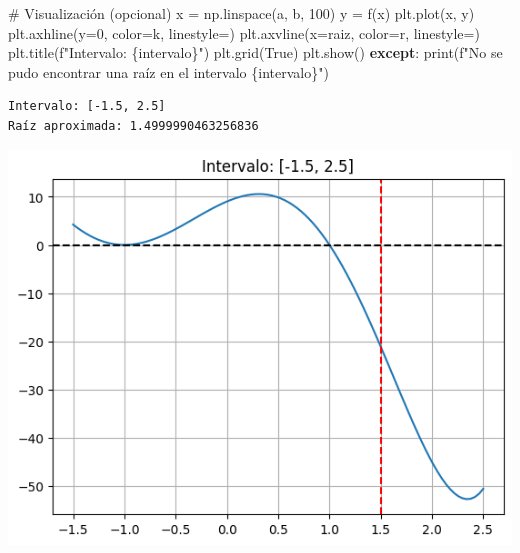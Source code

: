 \documentclass[
  letterpaper,
  DIV=11,
  numbers=noendperiod]{scrartcl}
\newenvironment{Shaded}{\begin{snugshade}}{\end{snugshade}}
\newcommand{\BuiltInTok}[1]{\textcolor[rgb]{0.00,0.23,0.31}{#1}}
\newcommand{\CommentTok}[1]{\textcolor[rgb]{0.37,0.37,0.37}{#1}}
\newcommand{\ControlFlowTok}[1]{\textcolor[rgb]{0.00,0.23,0.31}{\textbf{#1}}}
\newcommand{\DecValTok}[1]{\textcolor[rgb]{0.68,0.00,0.00}{#1}}
\newcommand{\NormalTok}[1]{\textcolor[rgb]{0.00,0.23,0.31}{#1}}
\newcommand{\OperatorTok}[1]{\textcolor[rgb]{0.37,0.37,0.37}{#1}}
\newcommand{\SpecialCharTok}[1]{\textcolor[rgb]{0.37,0.37,0.37}{#1}}
\newcommand{\SpecialStringTok}[1]{\textcolor[rgb]{0.13,0.47,0.30}{#1}}
\newcommand{\StringTok}[1]{\textcolor[rgb]{0.13,0.47,0.30}{#1}}
\newcommand{\VariableTok}[1]{\textcolor[rgb]{0.07,0.07,0.07}{#1}}
\begin{document}
\begin{Shaded}
\begin{Highlighting}[]
        \CommentTok{\# Visualización (opcional)}
\NormalTok{        x }\OperatorTok{=}\NormalTok{ np.linspace(a, b, }\DecValTok{100}\NormalTok{)}
\NormalTok{        y }\OperatorTok{=}\NormalTok{ f(x)}
\NormalTok{        plt.plot(x, y)}
\NormalTok{        plt.axhline(y}\OperatorTok{=}\DecValTok{0}\NormalTok{, color}\OperatorTok{=}\StringTok{\textquotesingle{}k\textquotesingle{}}\NormalTok{, linestyle}\OperatorTok{=}\StringTok{\textquotesingle{}{-}{-}\textquotesingle{}}\NormalTok{)}
\NormalTok{        plt.axvline(x}\OperatorTok{=}\NormalTok{raiz, color}\OperatorTok{=}\StringTok{\textquotesingle{}r\textquotesingle{}}\NormalTok{, linestyle}\OperatorTok{=}\StringTok{\textquotesingle{}{-}{-}\textquotesingle{}}\NormalTok{)}
\NormalTok{        plt.title(}\SpecialStringTok{f"Intervalo: }\SpecialCharTok{\{}\NormalTok{intervalo}\SpecialCharTok{\}}\SpecialStringTok{"}\NormalTok{)}
\NormalTok{        plt.grid(}\VariableTok{True}\NormalTok{)}
\NormalTok{        plt.show()}
    \ControlFlowTok{except}\NormalTok{:}
        \BuiltInTok{print}\NormalTok{(}\SpecialStringTok{f"No se pudo encontrar una raíz en el intervalo }\SpecialCharTok{\{}\NormalTok{intervalo}\SpecialCharTok{\}}\SpecialStringTok{"}\NormalTok{)}
\end{Highlighting}
\end{Shaded}

\begin{verbatim}
Intervalo: [-1.5, 2.5]
Raíz aproximada: 1.4999990463256836
\end{verbatim}

\includegraphics{Deber3_files/figure-pdf/cell-6-output-2.png}
\end{document}

